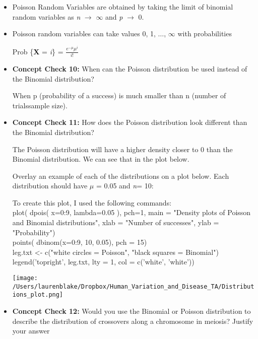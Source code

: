 \documentclass[12pt]{report}
\begin{document}
\begin{itemize}

\item Poisson Random Variables are obtained by taking the limit of binomial random variables as \textit{n} $\rightarrow$ $\infty$ and \textit{p} $\rightarrow$ 0. 

\item Poisson random variables can take values 0, 1, $\ldots$, $\infty$ with probabilities 

Prob \{\textbf{X} = \textit{i}\} = $\frac{e^{-\mu}\mu^{i}}{i!}$

\item \textbf{Concept Check 10:} When can the Poisson distribution be used instead of the Binomial distribution? 

\color{red} When p (probability of a success) is much smaller than n (number of trials\/sample size).  

\color{black}
\bigskip
\item \textbf{Concept Check 11:} How does the Poisson distribution look different than the Binomial distribution? 

\color{red} 
The Poisson distribution will have a higher density closer to 0 than the Binomial distribution. We can see that in the plot below.  

\color{black}
\bigskip

Overlay an example of each of the distributions on a plot below. Each distribution should have $\mu$ = 0.05 and \textit{n}= 10:

\color{red} To create this plot, I used the following commands: \\
plot( dpois( x=0:9, lambda=0.05 ), pch=1, main = "Density plots of Poisson and Binomial distributions", xlab = "Number of successes", ylab = "Probability") \\
points( dbinom(x=0:9, 10, 0.05), pch = 15) \\
leg.txt <- c("white circles = Poisson", "black squares = Binomial") \\
legend('topright', leg.txt, lty = 1, col = c('white', 'white')) \\
\color{black}



\texttt{[image: /Users/laurenblake/Dropbox/Human\_Variation\_and\_Disease\_TA/Distributions\_plot.png]}

\bigskip


\item \textbf{Concept Check 12:} Would you use the Binomial or Poisson distribution to describe the distribution of crossovers along a chromosome in meiosis? Justify your answer

\end{itemize}
\end{document}
